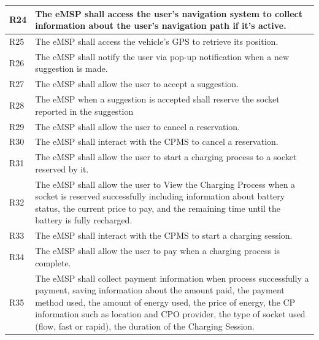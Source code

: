 \documentclass{Configuration_Files/PoliMi3i_thesis}
\begin{document}
\begin{xltabular}{\textwidth}{| >{}l | X |}
R24  &
    The eMSP shall access the user’s navigation system to collect information about the user’s navigation path if it's active.\B\\
\hline

R25  &
    The eMSP shall access the vehicle’s GPS to retrieve its position.\B\\
\hline

R26  &
    The eMSP shall notify the user via pop-up notification when a new suggestion is made.\B\\
\hline

R27  &
    The eMSP shall allow the user to accept a suggestion.\B\\
\hline

R28  &
    The eMSP when a suggestion is accepted shall reserve the socket reported in the suggestion\B\\
\hline

R29  &
     The eMSP shall allow the user to cancel a reservation.\B\\
\hline

R30  &
    The eMSP shall interact with the CPMS to cancel a reservation.\B\\
\hline


R31  &
    The eMSP shall allow the user to start a charging process to a socket reserved by it.\B\\
\hline


R32 &
    The eMSP shall allow the user to View  the Charging Process when a socket is reserved successfully including information about battery status, the current price to pay, and the remaining time until the battery is fully recharged.\B\\
\hline


R33 &
    The eMSP shall interact with the CPMS to start a charging session.\B\\
\hline

R34 &
    The eMSP shall allow the user to pay when a charging process is complete.\B\\
\hline

R35 &
    The eMSP shall collect payment information when process successfully a payment, saving information about the amount paid, the payment method used, the amount of energy used, the price of energy,  the CP information such as location and CPO provider, the type of socket used (flow, fast or rapid), the duration of the Charging Session.\B\\
\hline


\end{xltabular}
\end{document}
